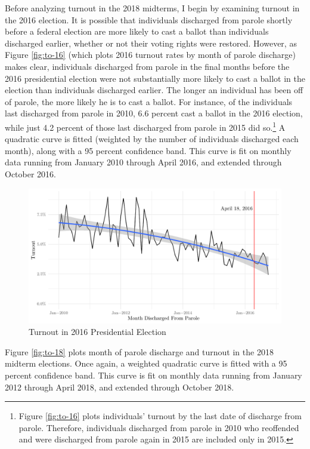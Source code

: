 \documentclass[12pt,]{article}
\let\rmarkdownfootnote\footnote%
\def\footnote{\protect\rmarkdownfootnote}
\begin{document}
Before analyzing turnout in the 2018 midterms, I begin by examining turnout in the 2016 election. It is possible that individuals discharged from parole shortly before a federal election are more likely to cast a ballot than individuals discharged earlier, whether or not their voting rights were restored. However, as Figure \ref{fig:to-16} (which plots 2016 turnout rates by month of parole discharge) makes clear, individuals discharged from parole in the final months before the 2016 presidential election were not substantially more likely to cast a ballot in the election than individuals discharged earlier. The longer an individual has been off of parole, the more likely he is to cast a ballot. For instance, of the individuals last discharged from parole in 2010, 6.6 percent cast a ballot in the 2016 election, while just 4.2 percent of those last discharged from parole in 2015 did so.\footnote{Figure \ref{fig:to-16} plots individuals' turnout by the last date of discharge from parole. Therefore, individuals discharged from parole in 2010 who reoffended and were discharged from parole again in 2015 are included only in 2015.} A quadratic curve is fitted (weighted by the number of individuals discharged each month), along with a 95 percent confidence band. This curve is fit on monthly data running from January 2010 through April 2016, and extended through October 2016.

\begin{figure}[H]

{\centering \includegraphics{felony_disenfranchisement_nys_files/figure-latex/to-16-chart-1} 

}

\caption{\label{fig:to-16}Turnout in 2016 Presidential Election}\label{fig:to-16-chart}
\end{figure}

Figure \ref{fig:to-18} plots month of parole discharge and turnout in the 2018 midterm elections. Once again, a weighted quadratic curve is fitted with a 95 percent confidence band. This curve is fit on monthly data running from January 2012 through April 2018, and extended through October 2018.
\end{document}
